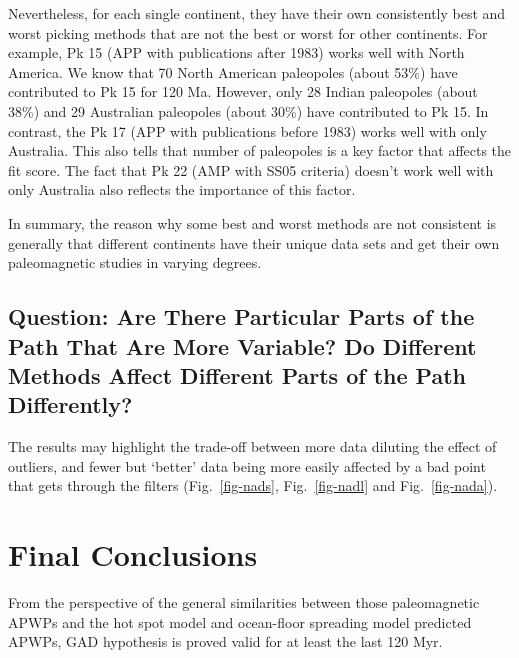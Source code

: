 Nevertheless, for each single continent, they have their own consistently best
and worst picking methods that are not the best or worst for other continents.
For example, Pk 15 (APP with publications after 1983) works well with North
America. We know that 70 North American paleopoles (about 53\%) have contributed
to Pk 15 for 120 Ma. However, only 28 Indian paleopoles (about 38\%)
and 29 Australian paleopoles (about 30\%) have contributed to Pk 15. In
contrast, the Pk 17 (APP with publications before 1983) works well with only
Australia. This also tells that number of paleopoles is a key factor that
affects the fit score. The fact that Pk 22 (AMP with SS05 criteria) doesn't work
well with only Australia also reflects the importance of this factor.

In summary, the reason why some best and worst methods are not consistent is
generally that different continents have their unique data sets and get their
own paleomagnetic studies in varying degrees.

\subsection{Question: Are There Particular Parts of the Path That Are More
Variable? Do Different Methods Affect Different Parts of the Path Differently?}

The results may highlight the trade-off between more data diluting the effect of
outliers, and fewer but `better' data being more easily affected by a bad point
that gets through the filters (Fig.~\ref{fig-nads}, Fig.~\ref{fig-nadl} and
Fig.~\ref{fig-nada}).



\section{Final Conclusions}

From the perspective of the general similarities between those paleomagnetic
APWPs and the hot spot model and ocean-floor spreading model predicted APWPs,
GAD hypothesis is proved valid for at least the last 120 Myr.

